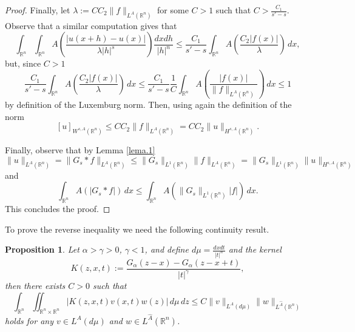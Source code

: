 \documentclass[leqno,twoside, 12pt]{amsart}
\theoremstyle{plain}
\numberwithin{equation}{section} \numberwithin{figure}{section}
\newtheorem{proposition}[theorem]{Proposition}
\theoremstyle{definition}
\newcommand{\R}{\mathbb R}
\numberwithin{equation}{section}
\begin{document}
\begin{proof}
  
Finally, let $\lambda := C C_2\|f\|_{L^A(\R^n)}$ for some $C>1$ such that $C>\frac{C_1}{s'-s}$. Observe that a similar computation gives that
$$
\int_{\R^n}\int_{\R^n} A\left(\frac{|u(x+h)-u(x)|}{\lambda |h|^s}\right)\frac{dxdh}{|h|^n}
\leq  \frac{C_1}{s'-s} \int_{\R^n} A\left(\frac{C_2|f(x)|}{\lambda}\right)\,dx,
$$
but, since $C>1$
$$
\frac{C_1}{s'-s} \int_{\R^n} A\left(\frac{C_2|f(x)|}{\lambda}\right)\,dx 
\leq 
\frac{C_1}{s'-s} \frac{1}{C}\int_{\R^n} A\left(\frac{|f(x)|}{ \|f\|_{L^A(\R^n)}}\right)\,dx\leq 1
$$
by definition of the Luxemburg norm. Then, using again the definition of the norm
$$
[u]_{W^{s,A}(\R^n)} \leq CC_2 \|f\|_{L^A(\R^n)}= CC_2 \|u\|_{H^{s,A}(\R^n)}.
$$

Finally, observe that by Lemma \ref{lema.1}
$$
\|u\|_{L^A(\R^n)}=\|G_s* f\|_{L^A(\R^n)}\leq  \|G_s\|_{L^1(\R^n)}\|f\|_{L^A(\R^n)} = \|G_s\|_{L^1(\R^n)}\|u\|_{H^{s,A}(\R^n)}
$$
and
$$
\int_{\R^n} A(|G_s*f|)\,dx \leq \int_{\R^n} A(\|G_s\|_{L^1(\R^n)}|f|)\,dx.
$$
This concludes the proof.
\end{proof}
 
 
 
\medskip



To prove the reverse inequality we need the following continuity result.
\begin{proposition} \label{prop.cont}
Let $\alpha>\gamma>0$,  $\gamma < 1$, and define $d\mu=\frac{dxdt}{|t|^n}$ and the kernel
$$
K(z,x,t):=\frac{G_\alpha(z-x)-G_\alpha(z-x+t)}{|t|^\gamma},
$$
then there exists $C>0$ such that
$$
\int_{\R^n} \iint_{\R^n \times \R^n} |K(z,x,t) v(x,t) w(z)|\,d\mu \,dz  \leq C \|v\|_{L^A( d\mu)} \|w\|_{L^{\hat A}(\R^n)}
$$
holds for any $v\in L^A( d\mu)$ and $w\in L^{\hat A}(\R^n)$.
\end{proposition}
\end{document}
